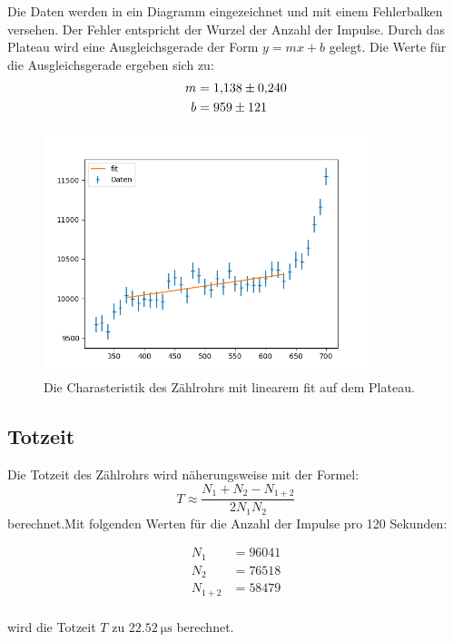 Die Daten werden in ein Diagramm eingezeichnet und mit einem Fehlerbalken versehen. Der Fehler entspricht der Wurzel der Anzahl der Impulse.
Durch das Plateau wird eine Ausgleichsgerade der Form $y = mx + b$ gelegt. Die Werte für die Ausgleichsgerade ergeben sich zu:
\begin{align}
    m&= \num{1.138 \pm 0.24} \nonumber \\
    b&= \num{959 \pm 121}    \nonumber
\end{align}

\begin{figure}[H]
    \centering
    \includegraphics[width=0.85\textwidth]{build/plots/a.png}
    \caption{Die Charasteristik des Zählrohrs mit linearem fit auf dem Plateau.}
    \label{img:plot1}
\end{figure}

\subsection{Totzeit}

Die Totzeit des Zählrohrs wird näherungsweise mit der Formel:
\begin{equation}
    T \approx \frac{N_1 + N_2 - N_{1+2}}{2N_1N_2}
\end{equation}
berechnet.Mit folgenden Werten für die Anzahl der Impulse pro 120 Sekunden:

\begin{align} 
    N_1 &= 96041\\
    N_2 &= 76518\\
    N_{1+2} &= 58479\\
\end{align}

wird die Totzeit $T$ zu $\SI{22.52}{\micro\second}$ berechnet.


